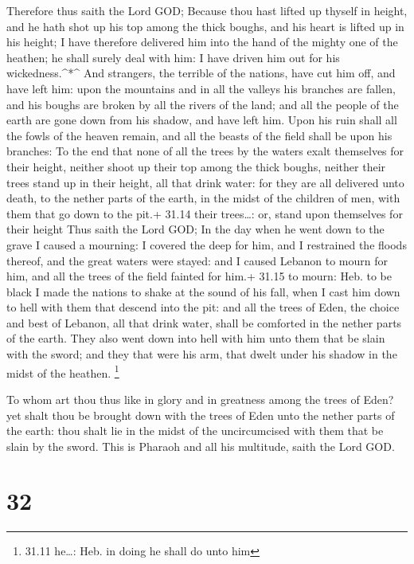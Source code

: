  Therefore thus saith the Lord GOD; Because thou hast
lifted up thyself in height, and he hath shot up his top among the thick
boughs, and his heart is lifted up in his height;  I have
therefore delivered him into the hand of the mighty one of the heathen;
he shall surely deal with him: I have driven him out for his
wickedness.\^{}*\^{}  And strangers, the terrible of the
nations, have cut him off, and have left him: upon the mountains and in
all the valleys his branches are fallen, and his boughs are broken by
all the rivers of the land; and all the people of the earth are gone
down from his shadow, and have left him.  Upon his ruin
shall all the fowls of the heaven remain, and all the beasts of the
field shall be upon his branches:  To the end that none of
all the trees by the waters exalt themselves for their height, neither
shoot up their top among the thick boughs, neither their trees stand up
in their height, all that drink water: for they are all delivered unto
death, to the nether parts of the earth, in the midst of the children of
men, with them that go down to the pit.+ 31.14 their trees\ldots: or,
stand upon themselves for their height  Thus saith the Lord
GOD; In the day when he went down to the grave I caused a mourning: I
covered the deep for him, and I restrained the floods thereof, and the
great waters were stayed: and I caused Lebanon to mourn for him, and all
the trees of the field fainted for him.+ 31.15 to mourn: Heb. to be
black  I made the nations to shake at the sound of his
fall, when I cast him down to hell with them that descend into the pit:
and all the trees of Eden, the choice and best of Lebanon, all that
drink water, shall be comforted in the nether parts of the earth.
 They also went down into hell with him unto them that be
slain with the sword; and they that were his arm, that dwelt under his
shadow in the midst of the heathen. \footnote{31.11 he\ldots: Heb. in
  doing he shall do unto him}

 To whom art thou thus like in glory and in greatness among
the trees of Eden? yet shalt thou be brought down with the trees of Eden
unto the nether parts of the earth: thou shalt lie in the midst of the
uncircumcised with them that be slain by the sword. This is Pharaoh and
all his multitude, saith the Lord GOD.

\hypertarget{section-31}{%
\section{32}\label{section-31}}

